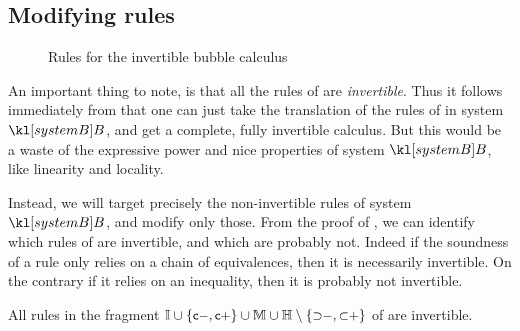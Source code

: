 \subsection{Modifying rules}

\begin{figure*}
  
  \caption{Rules for the invertible bubble calculus }
\end{figure*}

An important thing to note, is that all the rules of  are
\emph{invertible}. Thus it follows immediately from
 that one can just take the translation of the rules
of  in system $\sysB$, and get a complete, fully invertible
calculus. But this would be a waste of the expressive power and nice properties
of system $\sysB$, like linearity and locality.

Instead, we will target precisely the non-invertible rules of system $\sysB$,
and modify only those. From the proof of , we
can identify which rules of  are invertible, and which are
probably not. Indeed if the soundness of a rule only relies on a chain of
equivalences, then it is necessarily invertible. On the contrary if it relies on
an inequality, then it is probably not invertible.

\begin{fact}
  All rules in the fragment $\mathbb{I} \cup \{\text{\small$\mathsf{c{-}}$},\text{\small$\mathsf{c{+}}$}\} \cup
    \mathbb{M} \cup \mathbb{H} \setminus \{\text{\small$\mathsf{{\supset}{-}}$},\text{\small$\mathsf{{\subset}{+}}$}\}$ of
   are invertible.
\end{fact}

